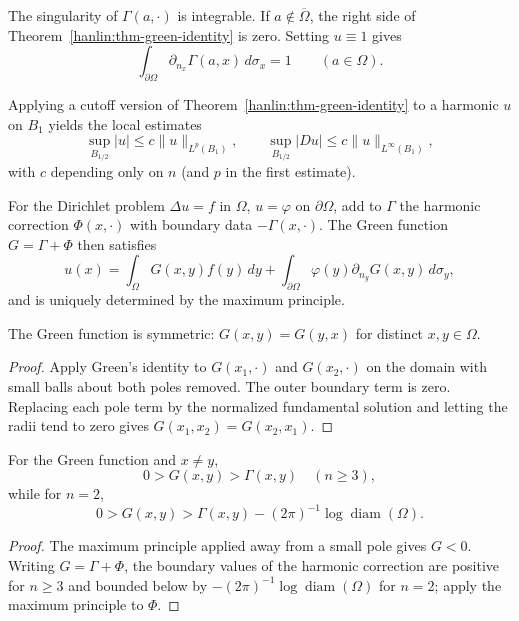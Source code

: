 \begin{remark}\label{hanlin:remark-green-identity}
The singularity of $\Gamma(a,\cdot)$ is integrable. If $a\notin\overline\Omega$,
the right side of Theorem~\ref{hanlin:thm-green-identity} is zero. Setting
$u\equiv1$ gives
\[
\int_{\partial\Omega}\partial_{n_x}\Gamma(a,x)\,d\sigma_x=1\qquad(a\in\Omega).
\]
\end{remark}

\begin{remark}\label{hanlin:remark-local-green-gradient}
Applying a cutoff version of Theorem~\ref{hanlin:thm-green-identity} to a
harmonic $u$ on $B_1$ yields the local estimates
\[
\sup_{B_{1/2}}|u|\le c\|u\|_{L^p(B_1)},\qquad
\sup_{B_{1/2}}|Du|\le c\|u\|_{L^\infty(B_1)},
\]
with $c$ depending only on $n$ (and $p$ in the first estimate).
\end{remark}

For the Dirichlet problem $\Delta u=f$ in $\Omega$, $u=\varphi$ on
$\partial\Omega$, add to $\Gamma$ the harmonic correction $\Phi(x,\cdot)$
with boundary data $-\Gamma(x,\cdot)$. The Green function
$G=\Gamma+\Phi$ then satisfies
\[
u(x)=\int_\Omega G(x,y)f(y)\,dy+
\int_{\partial\Omega}\varphi(y)\partial_{n_y}G(x,y)\,d\sigma_y,
\]
and is uniquely determined by the maximum principle.

\begin{lemma}\label{hanlin:lemma-green-symmetric}
The Green function is symmetric: $G(x,y)=G(y,x)$ for distinct $x,y\in\Omega$.
\end{lemma}
\begin{proof}
\sketch Apply Green's identity to $G(x_1,\cdot)$ and $G(x_2,\cdot)$ on the
domain with small balls about both poles removed. The outer boundary term is
zero. Replacing each pole term by the normalized fundamental solution and
letting the radii tend to zero gives $G(x_1,x_2)=G(x_2,x_1)$.
\end{proof}

\begin{proposition}\label{hanlin:prop-green-sign}
For the Green function and $x\ne y$,
\[
0>G(x,y)>\Gamma(x,y)\quad(n\ge3),
\]
while for $n=2$,
\[
0>G(x,y)>\Gamma(x,y)-(2\pi)^{-1}\log\operatorname{diam}(\Omega).
\]
\end{proposition}
\begin{proof}
\sketch The maximum principle applied away from a small pole gives $G<0$.
Writing $G=\Gamma+\Phi$, the boundary values of the harmonic correction are
positive for $n\ge3$ and bounded below by $-(2\pi)^{-1}\log\operatorname{diam}(\Omega)$
for $n=2$; apply the maximum principle to $\Phi$.
\end{proof}

